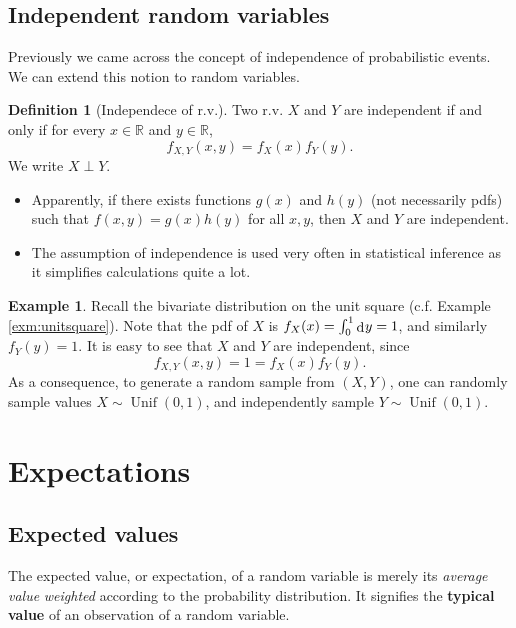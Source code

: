 \documentclass[
]{book}
\providecommand{\tightlist}{%
  \setlength{\itemsep}{0pt}\setlength{\parskip}{0pt}}
\DeclareMathOperator{\Unif}{Unif}
\newcommand{\bbR}{\mathbb{R}}
\DeclareMathOperator{\dd}{d}
\newcommand{\dint}{\dd\hspace{0.5pt}\!}
\theoremstyle{definition}
\newtheorem{definition}{Definition}[chapter]
\theoremstyle{definition}
\newtheorem{example}{Example}[chapter]
\theoremstyle{definition}
\theoremstyle{definition}
\theoremstyle{remark}
\begin{document}
\hypertarget{independent-random-variables}{%
\subsection{Independent random variables}\label{independent-random-variables}}

Previously we came across the concept of independence of probabilistic events.
We can extend this notion to random variables.

\begin{definition}[Independece of r.v.]
Two r.v. \(X\) and \(Y\) are independent if and only if for every \(x\in\bbR\) and \(y\in\bbR\),
\[
  f_{X,Y}(x,y) = f_X(x)f_Y(y).
\]
We write \(X \perp Y\).
\end{definition}

\begin{itemize}
\tightlist
\item
  Apparently, if there exists functions \(g(x)\) and \(h(y)\) (not necessarily pdfs) such that \(f(x,y)=g(x)h(y)\) for all \(x,y\), then \(X\) and \(Y\) are independent.
\item
  The assumption of independence is used very often in statistical inference as it simplifies calculations quite a lot.
\end{itemize}

\begin{example}
Recall the bivariate distribution on the unit square (c.f. Example \ref{exm:unitsquare}).
Note that the pdf of \(X\) is \(f_X(x) = \int_0^1 \dint y = 1\), and similarly \(f_Y(y)=1\).
It is easy to see that \(X\) and \(Y\) are independent, since
\[
f_{X,Y}(x,y) = 1 = f_X(x)f_Y(y).
\]
As a consequence, to generate a random sample from \((X,Y)\), one can randomly sample values \(X\sim\Unif(0,1)\), and independently sample \(Y\sim\Unif(0,1)\).
\end{example}

\hypertarget{expectations}{%
\section{Expectations}\label{expectations}}

\hypertarget{expected-values}{%
\subsection{Expected values}\label{expected-values}}

The expected value, or expectation, of a random variable is merely its \emph{average value} \emph{weighted} according to the probability distribution.
It signifies the \textbf{typical value} of an observation of a random variable.
\end{document}
